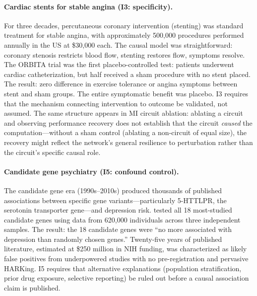 \documentclass[10pt]{article}
\begin{document}
\paragraph{Cardiac stents for stable angina (I3: specificity).}
For three decades, percutaneous coronary intervention (stenting) was standard treatment for stable angina, with approximately 500,000 procedures performed annually in the US at \$30,000 each. The causal model was straightforward: coronary stenosis restricts blood flow, stenting restores flow, symptoms resolve. The ORBITA trial \citep{alhabib2018orbita} was the first placebo-controlled test: patients underwent cardiac catheterization, but half received a sham procedure with no stent placed. The result: zero difference in exercise tolerance or angina symptoms between stent and sham groups. The entire symptomatic benefit was placebo. I3 requires that the mechanism connecting intervention to outcome be validated, not assumed. The same structure appears in MI circuit ablation: ablating a circuit and observing performance recovery does not establish that the circuit \emph{caused} the computation---without a sham control (ablating a non-circuit of equal size), the recovery might reflect the network's general resilience to perturbation rather than the circuit's specific causal role.

\paragraph{Candidate gene psychiatry (I5: confound control).}
The candidate gene era (1990s--2010s) produced thousands of published associations between specific gene variants---particularly 5-HTTLPR, the serotonin transporter gene---and depression risk. \citet{border2019no} tested all 18 most-studied candidate genes using data from 620,000 individuals across three independent samples. The result: the 18 candidate genes were ``no more associated with depression than randomly chosen genes.'' Twenty-five years of published literature, estimated at \$250 million in NIH funding, was characterized as likely false positives from underpowered studies with no pre-registration and pervasive HARKing. I5 requires that alternative explanations (population stratification, prior drug exposure, selective reporting) be ruled out before a causal association claim is published.
\end{document}
